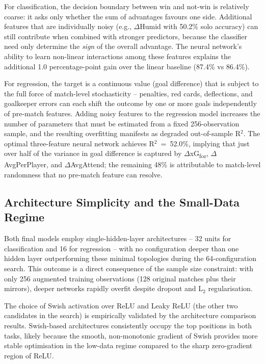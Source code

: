 \documentclass[a4paper,twoside]{article}
\begin{document}
For classification, the decision boundary between win and not-win is relatively coarse: it asks only whether the sum of advantages favours one side.
Additional features that are individually noisy (e.g., $\Delta$Humid with 50.2\% solo accuracy) can still contribute when combined with stronger predictors, because the classifier need only determine the \textit{sign} of the overall advantage.
The neural network's ability to learn non-linear interactions among these features explains the additional 1.0 percentage-point gain over the linear baseline (87.4\% vs 86.4\%).

For regression, the target is a continuous value (goal difference) that is subject to the full force of match-level stochasticity -- penalties, red cards, deflections, and goalkeeper errors can each shift the outcome by one or more goals independently of pre-match features.
Adding noisy features to the regression model increases the number of parameters that must be estimated from a fixed 256-observation sample, and the resulting overfitting manifests as degraded out-of-sample R$^{2}$.
The optimal three-feature neural network achieves R$^{2}$~=~52.0\%, implying that just over half of the variance in goal difference is captured by $\Delta$xG\textsubscript{for}, $\Delta$AvgPerPlayer, and $\Delta$AvgAttend; the remaining 48\% is attributable to match-level randomness that no pre-match feature can resolve.

\subsection{Architecture Simplicity and the Small-Data Regime}

Both final models employ single-hidden-layer architectures -- 32 units for classification and 16 for regression -- with no configuration deeper than one hidden layer outperforming these minimal topologies during the 64-configuration search.
This outcome is a direct consequence of the sample size constraint: with only 256 augmented training observations (128 original matches plus their mirrors), deeper networks rapidly overfit despite dropout and L$_{2}$ regularisation.

The choice of Swish activation over ReLU and Leaky ReLU (the other two candidates in the search) is empirically validated by the architecture comparison results.
Swish-based architectures consistently occupy the top positions in both tasks, likely because the smooth, non-monotonic gradient of Swish provides more stable optimisation in the low-data regime compared to the sharp zero-gradient region of ReLU.
\end{document}
